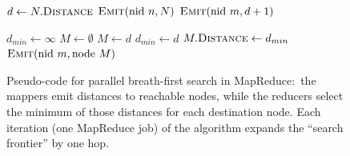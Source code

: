 \begin{figure}[t]
\algrenewcommand{}
\algrenewcommand{}
  \begin{algorithmic}[1]
    \State $d \gets N.\textsc{Distance}$
    \State $\textsc{Emit}(\textrm{nid }n, N)$
      \State $\textsc{Emit}(\textrm{nid }m, d+1)$
    \EndFor
    \EndProcedure
    \EndFunction
  \end{algorithmic}

  \begin{algorithmic}[1]
    \State $d_{min} \gets \infty$
    \State $M \gets \emptyset$
        \State $M \gets d$
        \State $d_{min} \gets d$
      \EndIf
    \EndFor
    \State $M.\textsc{Distance} \gets d_{min}$
    \State $\textsc{Emit}(\textrm{nid }m, \textrm{node }M)$
    \EndProcedure
    \EndFunction
  \end{algorithmic}
  \caption{Pseudo-code for parallel breath-first search in
    MapReduce:\ the mappers emit distances to reachable nodes, while
    the reducers select the minimum of those distances for each
    destination node.  Each iteration (one MapReduce job) of the
    algorithm expands the ``search frontier'' by one hop.}
\label{figure:chapter-graphs:BFS}
\end{figure}

